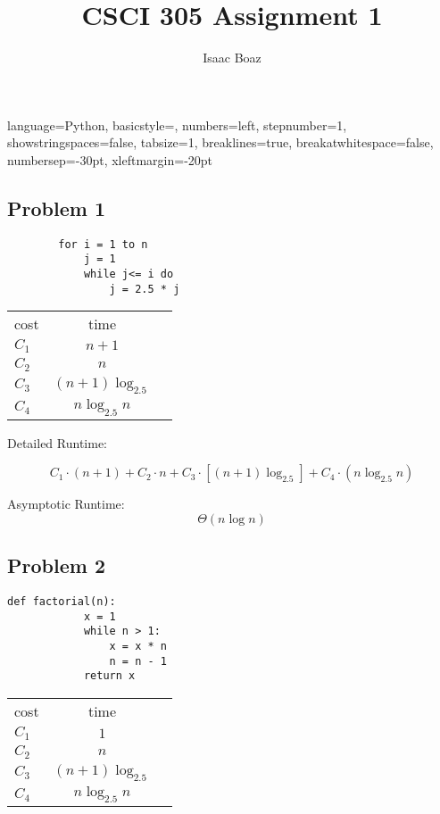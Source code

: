 \documentclass{article}
\title{CSCI 305 Assignment 1}
\author{Isaac Boaz}
\begin{document}
\maketitle

\lstset
{ %
    language=Python,
    basicstyle=\footnotesize,
    numbers=left,
    stepnumber=1,
    showstringspaces=false,
    tabsize=1,
    breaklines=true,
    breakatwhitespace=false,
    numbersep=-30pt,
    xleftmargin=-20pt
}
\setlength{\columnseprule}{0.1pt}

\subsection*{Problem 1}
\begin{multicols}{2}
    \begin{lstlisting}
        for i = 1 to n
            j = 1
            while j<= i do
                j = 2.5 * j
    \end{lstlisting}
    \columnbreak
    \footnotesize
    \begin{tabular}{lcc}
        cost  & time                 \\
        $C_1$ & $n + 1$              \\
        $C_2$ & $n$                  \\
        $C_3$ & $(n + 1) \log_{2.5}$ \\
        $C_4$ & $n \log_{2.5} n$
    \end{tabular}
\end{multicols}

Detailed Runtime:

\begin{equation*}
    C_1 \cdot (n + 1) + C_2 \cdot n + C_3 \cdot [(n+1) \log_{2.5}] + C_4 \cdot (n \log_{2.5}n)
\end{equation*}

Asymptotic Runtime:
\begin{equation*}
    \Theta(n \log n)
\end{equation*}

\subsection*{Problem 2}
\begin{multicols}{2}
    \begin{lstlisting}[firstnumber=0]
        def factorial(n):
            x = 1
            while n > 1:
                x = x * n
                n = n - 1
            return x
    \end{lstlisting}
    \columnbreak
    \footnotesize
    \begin{tabular}{lcc}
        cost  & time                 \\
        $C_1$ & $1$                  \\
        $C_2$ & $n$                  \\
        $C_3$ & $(n + 1) \log_{2.5}$ \\
        $C_4$ & $n \log_{2.5} n$
    \end{tabular}
\end{multicols}
\end{document}
